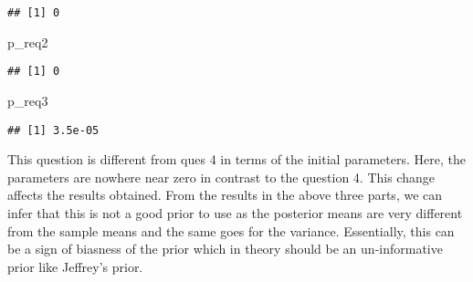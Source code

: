 \documentclass[]{article}
\newenvironment{Shaded}{\begin{snugshade}}{\end{snugshade}}
\newcommand{\NormalTok}[1]{{#1}}
\begin{document}
\begin{verbatim}
## [1] 0
\end{verbatim}

\begin{Shaded}
\begin{Highlighting}[]
\NormalTok{p_req2}
\end{Highlighting}
\end{Shaded}

\begin{verbatim}
## [1] 0
\end{verbatim}

\begin{Shaded}
\begin{Highlighting}[]
\NormalTok{p_req3}
\end{Highlighting}
\end{Shaded}

\begin{verbatim}
## [1] 3.5e-05
\end{verbatim}

This question is different from ques 4 in terms of the initial
parameters. Here, the parameters are nowhere near zero in contrast to
the question 4. This change affects the results obtained. From the
results in the above three parts, we can infer that this is not a good
prior to use as the posterior means are very different from the sample
means and the same goes for the variance. Essentially, this can be a
sign of biasness of the prior which in theory should be an
un-informative prior like Jeffrey's prior.
\end{document}
